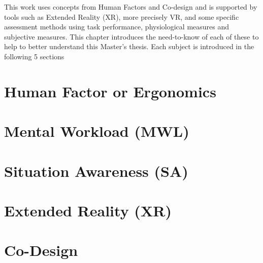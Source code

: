 
This work uses concepts from Human Factors and Co-design and is supported by tools such as Extended Reality (XR), more precisely VR, and some specific assessment methods using task performance, physiological measures and subjective measures. This chapter introduces the need-to-know of each of these to help to better understand this Master's thesis. Each subject is introduced in the following 5 sections

\section{Human Factor or Ergonomics}
\label{sec:human_factors}

    

\section{Mental Workload (MWL)}
\label{sec:mental_workload}

    

\section{Situation Awareness (SA)}
\label{sec:situation_awareness}

    

\section{Extended Reality (XR)}
\label{sec:extended_reality}

        
    

\section{Co-Design}
\label{sec:co_design}

    